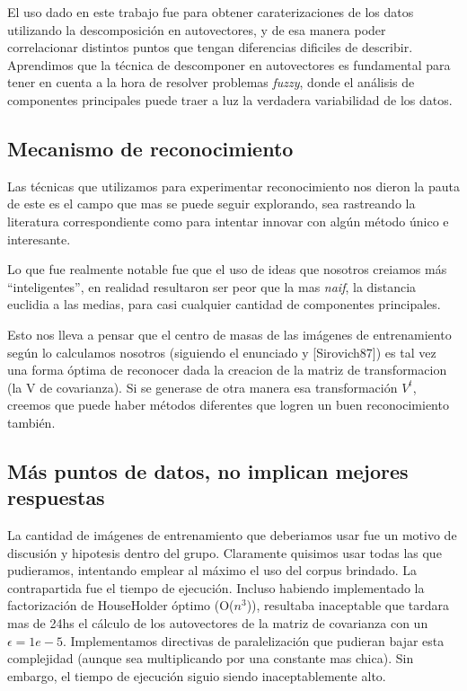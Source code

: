 El uso dado en este trabajo fue para obtener caraterizaciones de los datos utilizando la
descomposici\'on en autovectores, y de esa manera poder correlacionar distintos puntos que
tengan diferencias dificiles de describir. Aprendimos que la t\'ecnica de descomponer en autovectores
es fundamental para tener en cuenta a la hora de resolver problemas \textit{fuzzy}, donde
el an\'alisis de componentes principales puede traer a luz la verdadera variabilidad de los datos.


\subsection{Mecanismo de reconocimiento}

Las t\'ecnicas que utilizamos para experimentar reconocimiento nos dieron
la pauta de  este es el campo que mas se puede seguir explorando, sea rastreando la literatura
correspondiente como para intentar innovar con alg\'un m\'etodo \'unico e interesante.

Lo que fue realmente notable fue que el uso de ideas que nosotros creiamos m\'as ``inteligentes'',
en realidad resultaron ser peor que la mas \textit{naif}, la distancia euclidia a las medias, para
casi cualquier cantidad de componentes principales.

Esto nos lleva a pensar que el centro de masas de las im\'agenes de entrenamiento seg\'un lo calculamos
nosotros (siguiendo el enunciado y [Sirovich87]) es tal vez una forma \'optima de reconocer
dada la creacion de la matriz de transformacion (la V de covarianza). Si se generase de otra manera esa
transformaci\'on $V^t$, creemos que puede haber m\'etodos diferentes que logren un buen reconocimiento tambi\'en.


\subsection{M\'as puntos de datos, no implican mejores respuestas}

La cantidad de im\'agenes de entrenamiento que deberiamos usar fue un motivo de discusi\'on y hipotesis
dentro del grupo. Claramente quisimos usar todas las que pudieramos, intentando emplear al m\'aximo el
uso del corpus brindado. La contrapartida fue el tiempo de ejecuci\'on. Incluso habiendo implementado
la factorizaci\'on de HouseHolder \'optimo (O($n^3$)), resultaba inaceptable que tardara mas de 24hs
el c\'alculo de los autovectores de la matriz de covarianza con un $\epsilon = 1e-5$. Implementamos
directivas de paralelizaci\'on que pudieran bajar esta complejidad (aunque sea multiplicando por una
constante mas chica). Sin embargo, el tiempo de ejecuci\'on siguio siendo inaceptablemente alto.

